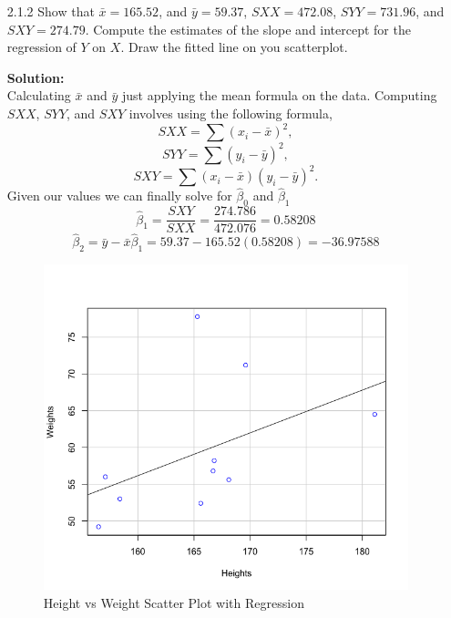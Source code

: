 \documentclass[12pt]{article}
\makeatletter
\theoremstyle{homework}
\newenvironment{exercise}[1]
{\def\@currentlabel{#1}\exercisecore}
{\endexercisecore}
\newcommand{\localhead}[1]{\par\smallskip\noindent\textbf{#1}\nobreak\\}%
\newcommand\solution{\localhead{Solution:}}
\makeatother
\begin{document}
\begin{exercise}{1}
\begin{enumerate}
  \item[2.1.2] Show that $\bar{x} = 165.52$, and $\bar{y} = 59.37$, $SXX = 472.08$, $SYY = 731.96$, and 
  $SXY = 274.79$. Compute the estimates of the slope and intercept for the regression of $Y$ on $X$. 
  Draw the fitted line on you scatterplot.  \\
  \solution Calculating $\bar{x}$ and $\bar{y}$ just applying the mean formula on the data. 
  Computing $SXX$, $SYY$, and $SXY$ involves using the following formula, 
  \begin{equation*}
    SXX = \sum(x_i - \bar{x})^2,
  \end{equation*}
  \begin{equation*}
    SYY = \sum(y_i - \bar{y})^2,
  \end{equation*}
  \begin{equation*}
    SXY = \sum(x_i - \bar{x})(y_i - \bar{y})^2.
  \end{equation*}
  Given our values we can finally solve for $\hat{\beta}_0$ and $\hat{\beta}_1$
  \begin{equation*}
    \hat{\beta}_1 = \dfrac{SXY}{SXX} = \dfrac{274.786}{472.076} = 0.58208
  \end{equation*}
  \begin{equation*}
    \hat{\beta}_2 =  \bar{y} -  \bar{x}\hat{\beta}_1 = 59.37 - 165.52(0.58208) = -36.97588
  \end{equation*}

  \begin{figure}[h]
    \begin{center}
    \caption{Height vs Weight Scatter Plot with Regression}
    \includegraphics[width=.66\textwidth]{Rplot2.png}
    \end{center}
\end{figure}


\end{enumerate}
\end{exercise}
\end{document}
